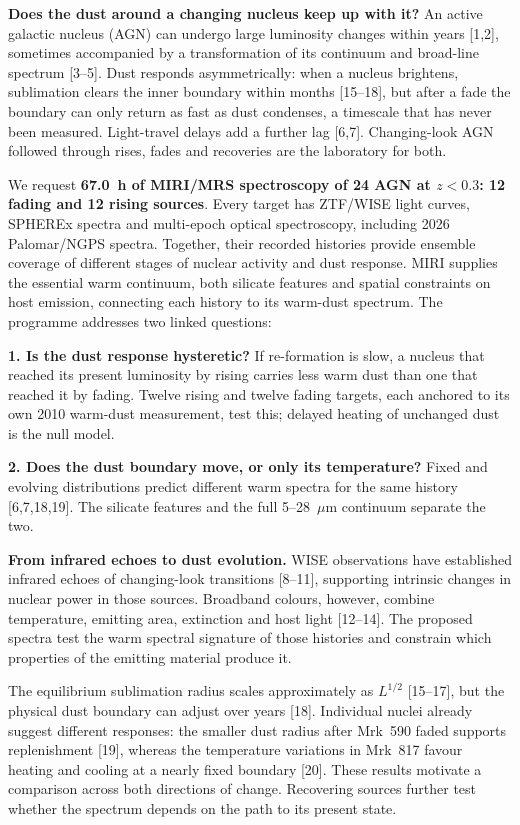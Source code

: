 \documentclass[12pt]{article}
\begin{document}
\scientificjustification

\noindent\textbf{Does the dust around a changing nucleus keep up with it?}
An active galactic nucleus (AGN) can undergo large luminosity changes within years [1,2], sometimes accompanied by a transformation of its continuum and broad-line spectrum [3--5]. Dust responds asymmetrically: when a nucleus brightens, sublimation clears the inner boundary within months [15--18], but after a fade the boundary can only return as fast as dust condenses, a timescale that has never been measured. Light-travel delays add a further lag [6,7]. Changing-look AGN followed through rises, fades and recoveries are the laboratory for both.

We request \textbf{67.0~h of MIRI/MRS spectroscopy of 24 AGN at $z<0.3$: 12 fading and 12 rising sources}. Every target has ZTF/WISE light curves, SPHEREx spectra and multi-epoch optical spectroscopy, including 2026 Palomar/NGPS spectra. Together, their recorded histories provide ensemble coverage of different stages of nuclear activity and dust response. MIRI supplies the essential warm continuum, both silicate features and spatial constraints on host emission, connecting each history to its warm-dust spectrum. The programme addresses two linked questions:

\noindent\textbf{1. Is the dust response hysteretic?} If re-formation is slow, a nucleus that reached its present luminosity by rising carries less warm dust than one that reached it by fading. Twelve rising and twelve fading targets, each anchored to its own 2010 warm-dust measurement, test this; delayed heating of unchanged dust is the null model.

\noindent\textbf{2. Does the dust boundary move, or only its temperature?} Fixed and evolving distributions predict different warm spectra for the same history [6,7,18,19]. The silicate features and the full 5--28~$\mu$m continuum separate the two.

\noindent\textbf{From infrared echoes to dust evolution.}
WISE observations have established infrared echoes of changing-look transitions [8--11], supporting intrinsic changes in nuclear power in those sources. Broadband colours, however, combine temperature, emitting area, extinction and host light [12--14]. The proposed spectra test the warm spectral signature of those histories and constrain which properties of the emitting material produce it.

The equilibrium sublimation radius scales approximately as $L^{1/2}$ [15--17], but the physical dust boundary can adjust over years [18]. Individual nuclei already suggest different responses: the smaller dust radius after Mrk~590 faded supports replenishment [19], whereas the temperature variations in Mrk~817 favour heating and cooling at a nearly fixed boundary [20]. These results motivate a comparison across both directions of change. Recovering sources further test whether the spectrum depends on the path to its present state.
\end{document}
